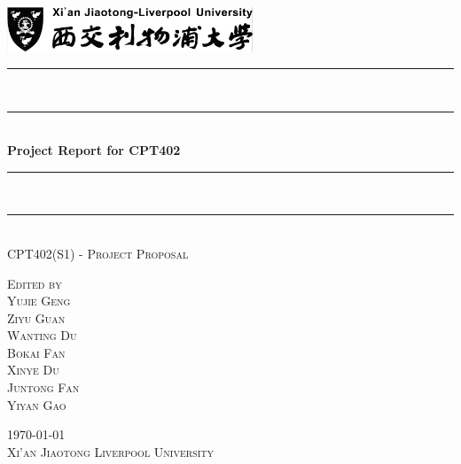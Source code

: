 \documentclass[12pt,arial,a4paper]{article}
\newcommand{\HRule}{\rule{\linewidth}{0.6mm}}
\begin{document}
\begin{titlepage}
\begin{center}

\includegraphics[width=0.55\textwidth]{logo.png}~\\[2cm]


 \HRule \\ \linespread{0.18}\selectfont
 \rule{159.32mm}{.1pt}%
\\[0.4cm]
{ \LARGE 
  \textbf{Project Report for CPT402}\\[0.4cm]
}
\rule{159.32mm}{.1pt}%
\\
\linespread{0.25}\selectfont
 \HRule \\[0.5cm]
\textsc{\large CPT402(S1) - Project Proposal}\\[0.3cm]

\vfill

\textsc{\small Edited by}\\[0.3cm]
\textsc{ \LARGE
  Yujie Geng \\[0.3cm]
  Ziyu Guan\\[0.3cm]
  Wanting Du\\[0.3cm]
  Bokai Fan\\[0.3cm]
  Xinye Du\\[0.3cm]
  Juntong Fan\\[0.3cm]
 Yiyan Gao \\[0.3cm]
}


\vfill
\textsc{\large \today }\\[0.3cm]
\textsc{\large Xi'an Jiaotong Liverpool University}\\[0.4cm]

 
\end{center}
\end{titlepage}

%

\newpage
\end{document}
